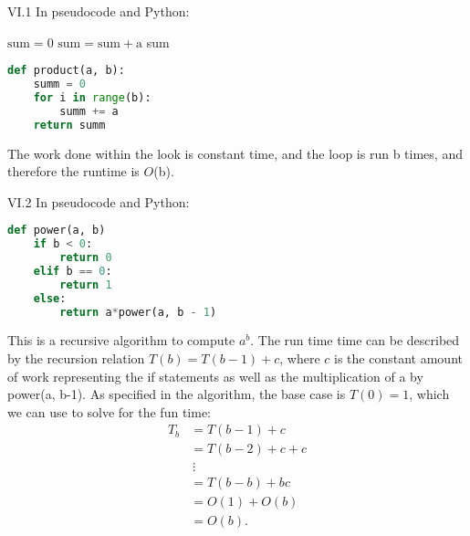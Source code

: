 \begin{problem}{VI.1} In pseudocode and Python:


\begin{algorithmic}[0]
\State $\text{sum} = 0$
      \State $\text{sum} = \text{sum}+ \text{a}$
    \EndFor
\State \Return sum
  \EndFunction
\end{algorithmic}



\begin{lstlisting}[language=Python]
def product(a, b):
	summ = 0
	for i in range(b):
		summ += a
	return summ
\end{lstlisting}

The work done within the look is constant time, and the loop is run b times, and therefore the runtime is $O$(b).


\end{problem}


\begin{problem}{VI.2} In pseudocode and Python:


\begin{algorithmic}[0]
 
\Else
{}
\EndIf
  \EndFunction
\end{algorithmic}




\begin{lstlisting}[language=Python]
def power(a, b)
	if b < 0:
		return 0
	elif b == 0:
		return 1
	else:
		return a*power(a, b - 1)
\end{lstlisting}

This is a recursive algorithm to compute $a^b$.  The run time time can be described by the recursion relation $T(b) = T(b-1)+c$, where $c$ is the constant amount of work representing the if statements as well as the multiplication of a by power(a, b-1).  As specified in the algorithm, the base case is $T(0)=1$, which we can use to solve for the fun time:
\begin{align*}
   T_{b} &= T(b-1) + c \\
    &= T(b-2) + c+c \\
   &~\vdots\\
   &= T(b-b) + bc \\
   &= O(1) + O(b) \\
   &= O(b).
\end{align*}
\end{problem}


